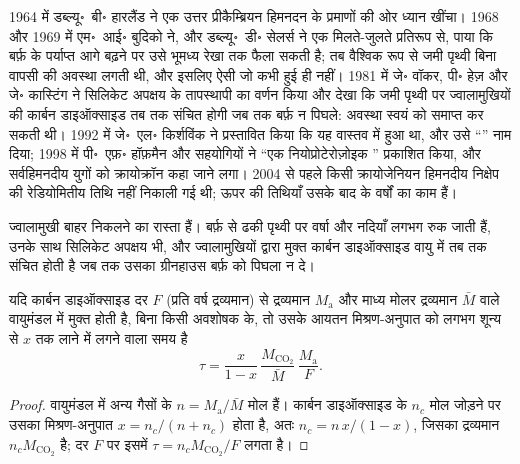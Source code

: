\begin{history}[एक विचित्र परिकल्पना से एक तिथि-निर्धारित सिद्धांत तक]
1964 में डब्ल्यू॰~बी॰ हारलैंड ने एक उत्तर प्रीकैम्ब्रियन हिमनदन के प्रमाणों की ओर ध्यान खींचा।
1968 और 1969 में एम॰~आई॰ बुदिको ने, और डब्ल्यू॰~डी॰ सेलर्स ने एक मिलते-जुलते प्रतिरूप से, पाया कि
 बर्फ़ के पर्याप्त आगे बढ़ने पर उसे भूमध्य रेखा तक फैला सकती है;
तब वैश्विक रूप से जमी पृथ्वी बिना वापसी की अवस्था लगती थी, और इसलिए ऐसी जो कभी हुई ही नहीं।
1981 में जे॰ वॉकर, पी॰ हेज़ और जे॰ कास्टिंग ने सिलिकेट अपक्षय के तापस्थापी का वर्णन किया और
देखा कि जमी पृथ्वी पर ज्वालामुखियों की कार्बन डाइऑक्साइड तब तक संचित होगी जब तक बर्फ़
न पिघले: अवस्था स्वयं को समाप्त कर सकती थी। 1992 में जे॰~एल॰ किर्शविंक ने प्रस्तावित किया कि यह वास्तव में
हुआ था, और उसे ``'' नाम दिया; 1998 में पी॰~एफ़॰ हॉफ़मैन और सहयोगियों ने
``एक नियोप्रोटेरोज़ोइक '' प्रकाशित किया, और सर्वहिमनदीय युगों को क्रायोक्रॉन कहा जाने लगा। 2004 से पहले
किसी क्रायोजेनियन हिमनदीय निक्षेप की रेडियोमितीय तिथि नहीं निकाली गई थी; ऊपर की तिथियाँ
उसके बाद के वर्षों का काम हैं।
\end{history}

ज्वालामुखी बाहर निकलने का रास्ता हैं। बर्फ़ से ढकी पृथ्वी पर वर्षा और नदियाँ लगभग रुक जाती हैं, उनके साथ सिलिकेट
अपक्षय भी, और ज्वालामुखियों द्वारा मुक्त कार्बन डाइऑक्साइड वायु में तब तक संचित होती है
जब तक उसका ग्रीनहाउस बर्फ़ को पिघला न दे।

\begin{proposition}[कार्बन डाइऑक्साइड का संचय]\label{prop:b2:precambrian-earth:co2}
यदि कार्बन डाइऑक्साइड दर $F$ (प्रति वर्ष द्रव्यमान) से द्रव्यमान
$M_{\text{a}}$ और माध्य मोलर द्रव्यमान $\bar M$ वाले वायुमंडल में मुक्त होती है, बिना किसी अवशोषक के, तो उसके आयतन
मिश्रण-अनुपात को लगभग शून्य से $x$ तक लाने में लगने वाला समय है
\[
  \tau = \frac{x}{1 - x}\,\frac{M_{\mathrm{CO_2}}}{\bar M}\,\frac{M_{\text{a}}}{F} .
\]
\end{proposition}

\begin{proof}
वायुमंडल में अन्य गैसों के $n = M_{\text{a}}/\bar M$ मोल हैं। कार्बन डाइऑक्साइड के $n_c$ मोल जोड़ने पर
उसका मिश्रण-अनुपात $x = n_c/(n + n_c)$ होता है, अतः $n_c = n\,x/(1 - x)$, जिसका द्रव्यमान
$n_c M_{\mathrm{CO_2}}$ है; दर $F$ पर इसमें $\tau = n_c M_{\mathrm{CO_2}}/F$ लगता है।
\end{proof}

